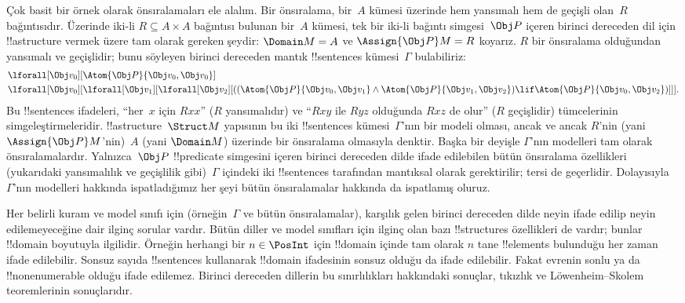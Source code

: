 Çok basit bir örnek olarak önsıralamaları ele alalım. Bir önsıralama,
bir~$A$ kümesi üzerinde hem yansımalı hem de geçişli olan~$R$
bağıntısıdır. Üzerinde iki-li $R\subseteq A\times A$ bağıntısı bulunan
bir~$A$ kümesi, tek bir iki-li bağıntı simgesi~$\Obj P$ içeren birinci
dereceden dil için !!a{structure} vermek üzere tam olarak gereken
şeydir: $\Domain M=A$ ve $\Assign{\Obj P}M=R$ koyarız. $R$ bir
önsıralama olduğundan yansımalı ve geçişlidir; bunu söyleyen birinci
dereceden mantık !!{sentence}s kümesi~$\Gamma$ bulabiliriz:
\begin{align*}
  & \lforall[\Obj v_0][\Atom{\Obj P}{\Obj v_0,\Obj v_0}]\\
  & \lforall[\Obj v_0][\lforall[\Obj v_1][\lforall[\Obj v_2][((\Atom{\Obj P}{\Obj v_0,\Obj v_1} \land \Atom{\Obj P}{\Obj v_1,\Obj v_2}) \lif \Atom{\Obj P}{\Obj v_0,\Obj v_2})]]].
\end{align*}
Bu !!{sentence}s ifadeleri, ``her~$x$ için $Rxx$'' ($R$ yansımalıdır)
ve ``$Rxy$ ile $Ryz$ olduğunda $Rxz$ de olur'' ($R$ geçişlidir)
tümcelerinin simgeleştirmeleridir. !!a{structure}~$\Struct M$ yapısının
bu iki !!{sentence}s kümesi~$\Gamma$'nın bir modeli olması, ancak ve
ancak $R$'nin (yani $\Assign{\Obj P}M$'nin)~$A$ (yani $\Domain M$)
üzerinde bir önsıralama olmasıyla denktir. Başka bir deyişle
$\Gamma$'nın modelleri tam olarak önsıralamalardır. Yalnızca~$\Obj P$
!!{predicate} simgesini içeren birinci dereceden dilde ifade edilebilen
bütün önsıralama özellikleri (yukarıdaki yansımalılık ve geçişlilik
gibi)~$\Gamma$ içindeki iki !!{sentence}s tarafından mantıksal olarak
gerektirilir; tersi de geçerlidir. Dolayısıyla~$\Gamma$'nın modelleri
hakkında ispatladığımız her şeyi bütün önsıralamalar hakkında da
ispatlamış oluruz.

Her belirli kuram ve model sınıfı için (örneğin~$\Gamma$ ve bütün
önsıralamalar), karşılık gelen birinci dereceden dilde neyin ifade
edilip neyin edilemeyeceğine dair ilginç sorular vardır. Bütün diller
ve model sınıfları için ilginç olan bazı !!{structure}s özellikleri de
vardır; bunlar !!{domain} boyutuyla ilgilidir. Örneğin herhangi bir
$n\in\PosInt$ için !!{domain} içinde tam olarak $n$ tane !!{element}s
bulunduğu her zaman ifade edilebilir. Sonsuz sayıda !!{sentence}s
kullanarak !!{domain} ifadesinin sonsuz olduğu da ifade edilebilir.
Fakat evrenin sonlu ya da !!{nonenumerable} olduğu ifade edilemez.
Birinci dereceden dillerin bu sınırlılıkları hakkındaki sonuçlar,
tıkızlık ve Löwenheim--Skolem teoremlerinin sonuçlarıdır.

